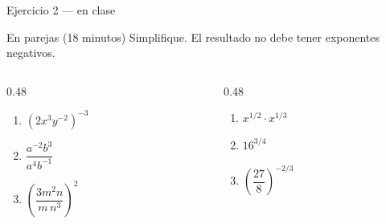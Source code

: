 \documentclass[aspectratio=169,10pt]{beamer}
\begin{document}
\begin{frame}{Ejercicio 2 — en clase}
  \begin{alertblock}{En parejas (18 minutos)}
    \scriptsize
    Simplifique. El resultado no debe tener exponentes negativos.

    \vspace{0.25cm}
    \begin{columns}[T,onlytextwidth]
      \begin{column}{0.48\textwidth}
        \begin{enumerate}\setlength{\itemsep}{0.22cm}
          \item $\left(2x^{3}y^{-2}\right)^{-3}$
          \item $\dfrac{a^{-2}b^{3}}{a^{4}b^{-1}}$
          \item $\left(\dfrac{3m^{2}n}{m\,n^{3}}\right)^{2}$
        \end{enumerate}
      \end{column}
      \begin{column}{0.48\textwidth}
        \begin{enumerate}\setlength{\itemsep}{0.22cm}
          \setcounter{enumi}{3}
          \item $x^{1/2}\cdot x^{1/3}$
          \item $16^{3/4}$
          \item $\left(\dfrac{27}{8}\right)^{-2/3}$
        \end{enumerate}
      \end{column}
    \end{columns}
  \end{alertblock}
\end{frame}
\end{document}
